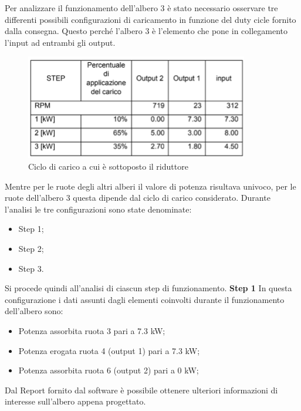 Per analizzare il funzionamento dell'albero 3 è stato necessario osservare tre differenti possibili configurazioni di caricamento in funzione del duty cicle fornito dalla consegna. Questo perché l'albero 3 è l'elemento che pone in collegamento l'input ad entrambi gli output.
\begin{figure}[h]
    \centering
    \includegraphics[scale=0.6]{Immagini/Carico.png}
    \caption{Ciclo di carico a cui è sottoposto il riduttore}
    \label{fig:Carico}
\end{figure}

Mentre per le ruote degli altri alberi il valore di potenza risultava univoco, per le ruote dell'albero 3 questa dipende dal ciclo di carico considerato. Durante l'analisi le tre configurazioni sono state denominate:
\begin{itemize}
    \item Step 1;
    \item Step 2;
    \item Step 3.
\end{itemize}

Si procede quindi all'analisi di ciascun step di funzionamento.
\newpage
\textbf{Step 1}
In questa configurazione i dati assunti dagli elementi coinvolti durante il funzionamento dell'albero sono:
\begin{itemize}
    \item Potenza assorbita ruota 3 pari a 7.3 kW;
    \item Potenza erogata ruota 4 (output 1) pari a 7.3 kW;
    \item Potenza assorbita ruota 6 (output 2) pari a 0 kW;
\end{itemize}

Dal Report fornito dal software è possibile ottenere ulteriori informazioni di interesse sull'albero appena progettato. 

